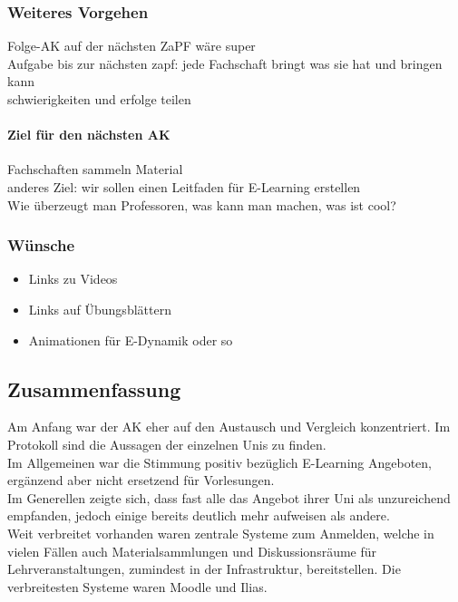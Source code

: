 \begin{itemize}
	\subsubsection*{Weiteres Vorgehen}
		Folge-AK auf der nächsten ZaPF wäre super \\
		Aufgabe bis zur nächsten zapf: jede Fachschaft bringt was sie hat und bringen kann \\
		schwierigkeiten und erfolge teilen \\

		\paragraph{Ziel für den nächsten AK}
			Fachschaften sammeln Material \\
			anderes Ziel: wir sollen einen Leitfaden für E-Learning erstellen \\

			Wie überzeugt man Professoren, was kann man machen, was ist cool?

	\subsubsection*{Wünsche}
		\begin{itemize}
			\item Links zu Videos
			\item Links auf Übungsblättern
			\item Animationen für E-Dynamik oder so
		\end{itemize}

	\subsection*{Zusammenfassung}
		Am Anfang war der AK eher auf den Austausch und Vergleich konzentriert. Im Protokoll sind die
		Aussagen der einzelnen Unis zu finden. \\

		Im Allgemeinen war die Stimmung positiv bezüglich E-Learning Angeboten, ergänzend aber nicht ersetzend
		für Vorlesungen. \\

		Im Generellen zeigte sich, dass fast alle das Angebot ihrer Uni als unzureichend empfanden,
		jedoch einige bereits deutlich mehr aufweisen als andere. \\

		Weit verbreitet vorhanden waren zentrale Systeme zum Anmelden, welche in vielen Fällen auch
		Materialsammlungen und Diskussionsräume für Lehrveranstaltungen, zumindest in der Infrastruktur,
		bereitstellen. Die verbreitesten Systeme waren Moodle und Ilias. \\


\end{itemize}
